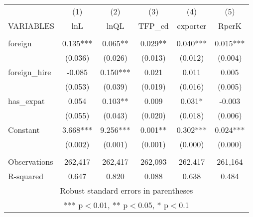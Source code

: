 \begin{tabular}{lccccc} \hline
 & (1) & (2) & (3) & (4) & (5) \\
VARIABLES & lnL & lnQL & TFP\_cd & exporter & RperK \\ \hline
 &  &  &  &  &  \\
foreign & 0.135*** & 0.065** & 0.029** & 0.040*** & 0.015*** \\
 & (0.036) & (0.026) & (0.013) & (0.012) & (0.004) \\
foreign\_hire & -0.085 & 0.150*** & 0.021 & 0.011 & 0.005 \\
 & (0.053) & (0.039) & (0.019) & (0.016) & (0.005) \\
has\_expat & 0.054 & 0.103** & 0.009 & 0.031* & -0.003 \\
 & (0.055) & (0.043) & (0.020) & (0.018) & (0.006) \\
Constant & 3.668*** & 9.256*** & 0.001** & 0.302*** & 0.024*** \\
 & (0.002) & (0.001) & (0.001) & (0.000) & (0.000) \\
 &  &  &  &  &  \\
Observations & 262,417 & 262,417 & 262,093 & 262,417 & 261,164 \\
 R-squared & 0.647 & 0.820 & 0.088 & 0.638 & 0.484 \\ \hline
\multicolumn{6}{c}{ Robust standard errors in parentheses} \\
\multicolumn{6}{c}{ *** p$<$0.01, ** p$<$0.05, * p$<$0.1} \\
\end{tabular}